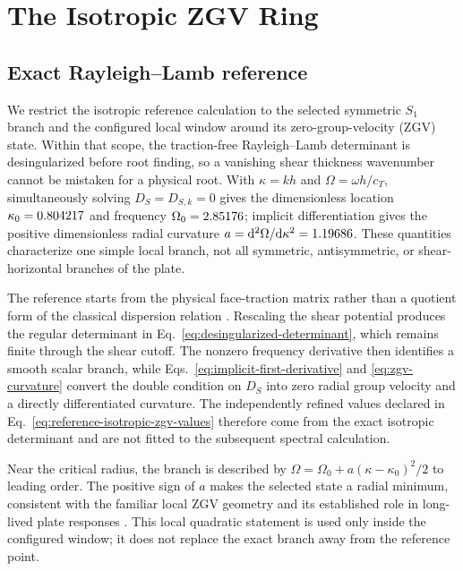 \section{The Isotropic ZGV Ring}

\subsection{Exact Rayleigh--Lamb reference}

We restrict the isotropic reference calculation to the selected symmetric
$S_1$ branch and the configured local window around its zero-group-velocity
(ZGV) state.  Within that scope, the traction-free Rayleigh--Lamb determinant
is desingularized before root finding, so a vanishing shear thickness
wavenumber cannot be mistaken for a physical root.  With
$\kappa=kh$ and $\Omega=\omega h/c_T$, simultaneously solving
$D_S=D_{S,k}=0$ gives the dimensionless location
$\kappa_0=0.804217$ and frequency $\Omega_0=2.85176$; implicit
differentiation gives the positive dimensionless radial curvature
$a=\mathrm d^2\Omega/\mathrm d\kappa^2=1.19686$.  These quantities
characterize one simple local branch,
not all symmetric, antisymmetric, or shear-horizontal branches of the plate.

The reference starts from the physical face-traction matrix rather than a
quotient form of the classical dispersion relation
\citep{lamb1917waves}.  Rescaling the shear potential produces the regular
determinant in Eq.~\eqref{eq:desingularized-determinant}, which remains finite
through the shear cutoff.  The nonzero frequency derivative then identifies a
smooth scalar branch, while Eqs.~\eqref{eq:implicit-first-derivative} and
\eqref{eq:zgv-curvature} convert the double condition on $D_S$ into zero radial
group velocity and a directly differentiated curvature.  The independently
refined values declared in Eq.~\eqref{eq:reference-isotropic-zgv-values}
therefore come from the exact isotropic determinant and are not fitted to the
subsequent spectral calculation.

Near the critical radius, the branch is described by
$\Omega=\Omega_0+a(\kappa-\kappa_0)^2/2$ to leading order.  The positive sign
of $a$ makes the selected state a radial minimum, consistent with the familiar
local ZGV geometry and its established role in long-lived plate responses
\citep{prada2008power}.  This local quadratic statement is used only inside
the configured window; it does not replace the exact branch away from the
reference point.

